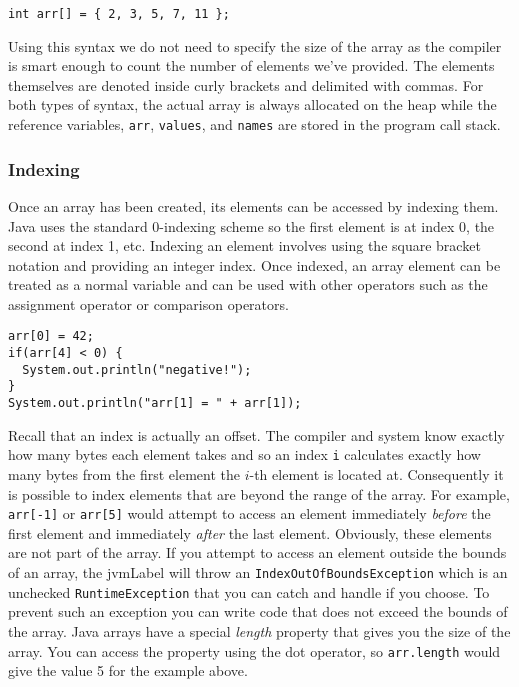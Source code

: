 \begin{verbatim}
int arr[] = { 2, 3, 5, 7, 11 };
\end{verbatim}

Using this syntax we do not need to specify the size of the array 
as the compiler is smart enough to count the number of elements
we've provided.  The elements themselves are denoted inside curly
brackets and delimited with commas.  For both types of syntax, the 
actual array is always allocated on the heap
while the reference variables, \texttt{arr}, \texttt{values}, 
and \texttt{names} are stored in the program call stack.

\subsubsection{Indexing}

Once an array has been created, its elements can be accessed
by indexing them.  Java uses the standard 0-indexing scheme so the
first element is at index 0, the second at index 1, etc.  Indexing
an element involves using the square bracket notation and
providing an integer index.  Once indexed, an array element can be
treated as a normal variable and can be used with other operators
such as the assignment operator or comparison operators.

\begin{verbatim}
arr[0] = 42;
if(arr[4] < 0) {
  System.out.println("negative!");
}
System.out.println("arr[1] = " + arr[1]);
\end{verbatim}

Recall that an index is actually an offset.  The compiler and
system know exactly how many bytes each 
element takes and so an index \texttt{i} calculates
exactly how many bytes from the first element the $i$-th
element is located at.  Consequently it is possible to index
elements that are beyond the range of the array.  For example, 
\texttt{arr[-1]} or \texttt{arr[5]} would attempt
to access an element immediately \emph{before} the first element
and immediately \emph{after} the last element.  Obviously, 
these elements are not part of the array.  
If you attempt to access an element outside the bounds of
an array, the \gls{jvmLabel} will throw an \texttt{IndexOutOfBoundsException}
which is an unchecked \texttt{RuntimeException} that you can
catch and handle if you choose.  To prevent such an exception
you can write code that does not exceed the bounds of the
array.  Java arrays have a special \emph{length} property that
gives you the size of the array.  You can access the property
using the dot operator, so \texttt{arr.length} would
give the value 5 for the example above.  

